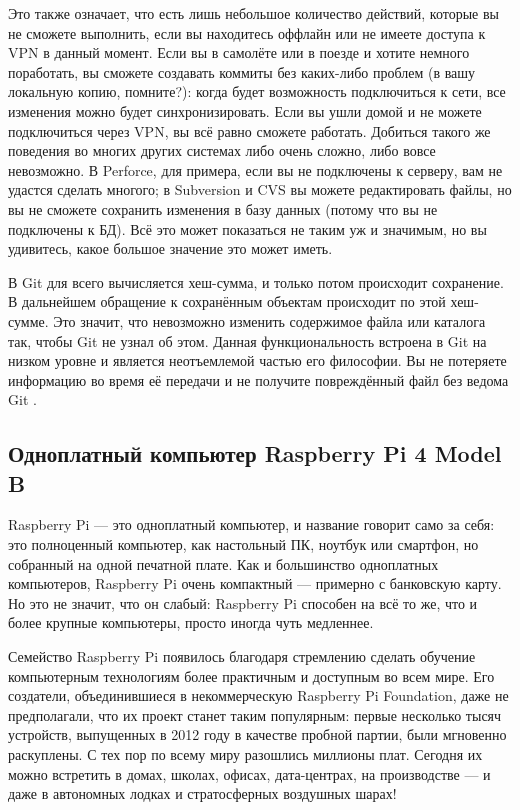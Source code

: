 Это также означает, что есть лишь небольшое количество действий, которые вы не сможете выполнить, если вы находитесь оффлайн или не имеете доступа к VPN в данный момент. Если вы в самолёте или в поезде и хотите немного поработать, вы сможете создавать коммиты без каких-либо проблем (в вашу локальную копию, помните?): когда будет возможность подключиться к сети, все изменения можно будет синхронизировать. Если вы ушли домой и не можете подключиться через VPN, вы всё равно сможете работать.
Добиться такого же поведения во многих других системах либо очень сложно, либо вовсе
невозможно. В Perforce, для примера, если вы не подключены к серверу, вам не удастся
сделать многого; в Subversion и CVS вы можете редактировать файлы, но вы не сможете
сохранить изменения в базу данных (потому что вы не подключены к БД). Всё это может
показаться не таким уж и значимым, но вы удивитесь, какое большое значение это может
иметь.

В Git для всего вычисляется хеш-сумма, и только потом происходит сохранение. В
дальнейшем обращение к сохранённым объектам происходит по этой хеш-сумме. Это
значит, что невозможно изменить содержимое файла или каталога так, чтобы Git не узнал
об этом. Данная функциональность встроена в Git на низком уровне и является
неотъемлемой частью его философии. Вы не потеряете информацию во время её передачи и
не получите повреждённый файл без ведома Git \cite{ProGit}.

\subsection{Одноплатный компьютер Raspberry Pi 4 Model B}

Raspberry Pi — это одноплатный компьютер, и название говорит само за себя:
это полноценный компьютер, как настольный ПК, ноутбук или смартфон, но собранный на одной печатной плате. Как и большинство одноплатных компьютеров, Raspberry Pi очень компактный — примерно с банковскую карту. Но это не значит, что он слабый: Raspberry Pi способен на всё то же, что и более крупные компьютеры, просто иногда чуть медленнее.

Семейство Raspberry Pi появилось благодаря стремлению сделать обучение компьютерным технологиям более практичным и доступным во всем мире. Его создатели, объединившиеся в некоммерческую Raspberry Pi Foundation, даже не предполагали, что их проект станет таким популярным: первые несколько тысяч устройств, выпущенных в 2012 году в качестве пробной партии, были мгновенно раскуплены. С тех пор по всему миру разошлись миллионы плат. Сегодня их можно встретить в домах, школах, офисах, дата-центрах, на производстве — и даже в автономных лодках и стратосферных воздушных шарах!

